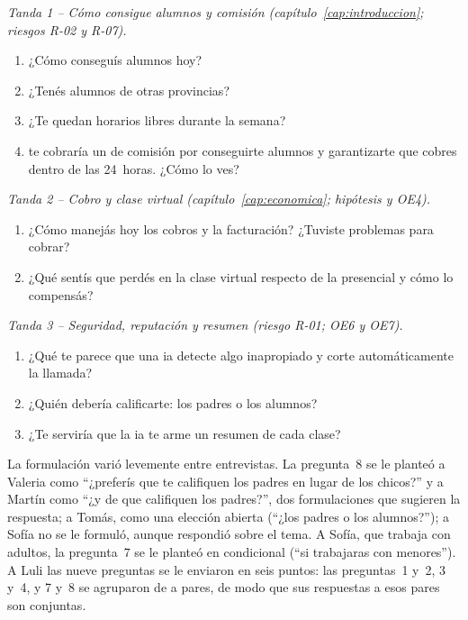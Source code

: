 \emph{Tanda 1 -- Cómo consigue alumnos y comisión (capítulo~\ref{cap:introduccion};
riesgos R-02 y R-07).}

\begin{enumerate}
    \item ¿Cómo conseguís alumnos hoy?
    \item ¿Tenés alumnos de otras provincias?
    \item ¿Te quedan horarios libres durante la semana?
    \item \sistema{} te cobraría un \comision{} de comisión por conseguirte
          alumnos y garantizarte que cobres dentro de las 24~horas. ¿Cómo
          lo ves?
\end{enumerate}

\emph{Tanda 2 -- Cobro y clase virtual (capítulo~\ref{cap:economica};
hipótesis y OE4).}

\begin{enumerate}[resume]
    \item ¿Cómo manejás hoy los cobros y la facturación? ¿Tuviste
          problemas para cobrar?
    \item ¿Qué sentís que perdés en la clase virtual respecto de la
          presencial y cómo lo compensás?
\end{enumerate}

\emph{Tanda 3 -- Seguridad, reputación y resumen (riesgo R-01; OE6 y OE7).}

\begin{enumerate}[resume]
    \item ¿Qué te parece que una \gls{ia} detecte algo inapropiado y corte
          automáticamente la llamada?
    \item ¿Quién debería calificarte: los padres o los alumnos?
    \item ¿Te serviría que la \gls{ia} te arme un resumen de cada clase?
\end{enumerate}

La formulación varió levemente entre entrevistas. La pregunta~8 se le
planteó a Valeria como ``¿preferís que te califiquen los padres en lugar
de los chicos?'' y a Martín como ``¿y de que califiquen los padres?'',
dos formulaciones que sugieren la respuesta; a Tomás, como una elección
abierta (``¿los padres o los alumnos?''); a Sofía no se le formuló, aunque
respondió sobre el tema. A Sofía, que trabaja con adultos, la
pregunta~7 se le planteó en condicional (``si trabajaras con menores'').
A Luli las nueve preguntas se le enviaron en seis puntos: las
preguntas~1 y~2, 3 y~4, y 7 y~8 se agruparon de a pares, de modo que
sus respuestas a esos pares son conjuntas.

